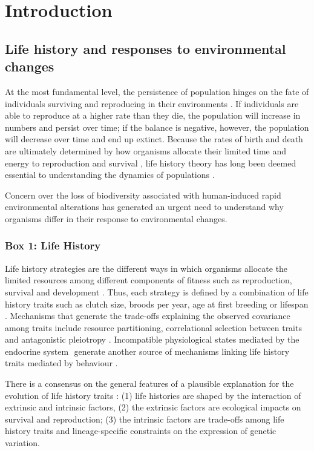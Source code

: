 \chapter{Introduction}\label{ch:intro}


\section{Life history and responses to environmental changes}

At the most fundamental level, the persistence of population hinges on the fate
of individuals surviving and reproducing in their environments \citep{Sol2016}.
If individuals
are able to reproduce at a higher rate than they die, the population will
increase in numbers and persist over time; if the balance is negative, however,
the population will decrease over time and end up extinct.
Because the rates of birth and death are ultimately determined by how
organisms allocate their limited time and energy to reproduction and survival
\citep{stearns1992evolution}, life history theory has long been deemed essential
to understanding the dynamics of populations \citep{Saether2004, Sol2012a}.

Concern over the loss of biodiversity associated with human-induced rapid 
environmental alterations has generated an urgent need to understand why
organisms differ in their response to environmental changes.


\begin{small}
\begin{framed}
\subsection*{Box 1: Life History}
Life history strategies are the different ways in which organisms allocate the
limited resources among different components of fitness such as reproduction,
survival and development \citep{stearns1992evolution,roff2002}⁠.
Thus, each strategy is defined by a combination of life history traits such as
clutch size, broods per year, age at first breeding or lifespan
\citep{Violle2007}⁠.
Mechanisms that generate the trade-offs explaining the observed covariance
among traits include resource partitioning, correlational selection between
traits and antagonistic pleiotropy \citep{Roff2007, Stearns1989a}.
Incompatible physiological states mediated by the endocrine system
\citep{Ricklefs2002}⁠ generate another source of mechanisms linking life
history traits mediated by behaviour \citep{Reale2010a}.

There is a consensus on the general features of a plausible explanation for the
evolution of life history traits \citep{Stearns2000}⁠: (1) life histories
are shaped by the interaction of extrinsic and intrinsic factors, (2) the
extrinsic factors are ecological impacts on survival and reproduction; (3) the
intrinsic factors are trade-offs among life history traits and lineage-specific
constraints on the expression of genetic variation.
\end{framed}
\end{small}


